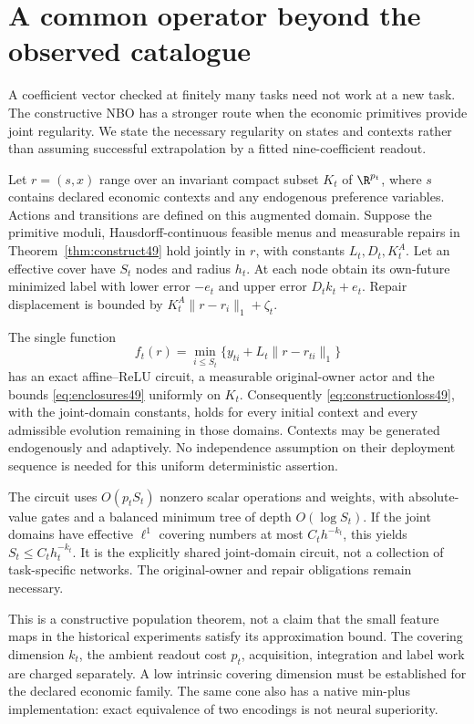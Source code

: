 \section{A common operator beyond the observed catalogue}\label{sec:population86}
A coefficient vector checked at finitely many tasks need not work at a new task. The constructive NBO has a stronger route when the economic primitives provide joint regularity. We state the necessary regularity on states and contexts rather than assuming successful extrapolation by a fitted nine-coefficient readout.

Let $r=(s,x)$ range over an invariant compact subset $K_t$ of $\R^{p_t}$, where $s$ contains declared economic contexts and any endogenous preference variables. Actions and transitions are defined on this augmented domain. Suppose the primitive moduli, Hausdorff-continuous feasible menus and measurable repairs in Theorem~\ref{thm:construct49} hold jointly in $r$, with constants $L_t,D_t,K_t^A$. Let an effective cover have $S_t$ nodes and radius $h_t$. At each node obtain its own-future minimized label with lower error $-e_t$ and upper error $D_tk_t+e_t$. Repair displacement is bounded by $K_t^A\|r-r_i\|_1+\zeta_t$.

\begin{theorem}\label{thm:population86}
The single function
\[
 f_t(r)=\min_{i\le S_t}\{y_{ti}+L_t\|r-r_{ti}\|_1\}
\]
has an exact affine--ReLU circuit, a measurable original-owner actor and the bounds \eqref{eq:enclosures49} uniformly on $K_t$. Consequently \eqref{eq:constructionloss49}, with the joint-domain constants, holds for every initial context and every admissible evolution remaining in those domains. Contexts may be generated endogenously and adaptively. No independence assumption on their deployment sequence is needed for this uniform deterministic assertion.

The circuit uses $O(p_tS_t)$ nonzero scalar operations and weights, with absolute-value gates and a balanced minimum tree of depth $O(\log S_t)$. If the joint domains have effective $\ell^1$ covering numbers at most $C_th^{-k_t}$, this yields $S_t\le C_th_t^{-k_t}$. It is the explicitly shared joint-domain circuit, not a collection of task-specific networks. The original-owner and repair obligations remain necessary.
\end{theorem}

This is a constructive population theorem, not a claim that the small feature maps in the historical experiments satisfy its approximation bound. The covering dimension $k_t$, the ambient readout cost $p_t$, acquisition, integration and label work are charged separately. A low intrinsic covering dimension must be established for the declared economic family. The same cone also has a native min-plus implementation: exact equivalence of two encodings is not neural superiority.

